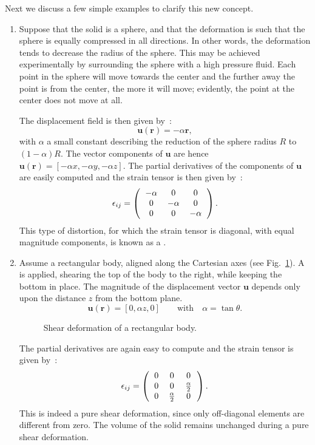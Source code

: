 Next we discuss a few simple examples to clarify this new concept.
\begin{enumerate}\label{strainexamples}
\item Suppose that the solid is a sphere, and that the deformation is such that the sphere is equally compressed in all directions.  In other words, the deformation tends to decrease the radius of the sphere.  This may be achieved experimentally by surrounding the sphere with a high pressure fluid.  Each point in the sphere will move towards the center and the further away the point is from the center, the more it will move; evidently, the point at the center does not move at all.

The displacement field is then given by~:
\[
\mathbf{u}(\mathbf{r})=-\alpha\mathbf{r},
\]
with $\alpha$ a small constant describing the reduction of the sphere radius $R$ to $(1-\alpha)R$.  The vector components of $\mathbf{u}$ are hence $\mathbf{u}(\mathbf{r})=[-\alpha x,-\alpha y,-\alpha z]$.  The partial derivatives of the components of $\mathbf{u}$ are easily computed and the strain tensor is then given by~:
\[
\epsilon_{ij}=
\left(\begin{tabular}{ccc}\centering
$-\alpha$  &  0 & 0 \\ 
0 & $-\alpha$  &  0 \\
0 & 0 & $-\alpha$   \\
\end{tabular}\right).
\]
This type of distortion, for which the strain tensor is diagonal, with equal magnitude components, is known as a .  

\item Assume a rectangular body, aligned along the Cartesian axes (see Fig.~\ref{\chabbr:fig:h2}).  A  is applied, shearing the top of the body to the right, while keeping the bottom in place.  The magnitude of the displacement vector $\mathbf{u}$ depends only upon the distance $z$ from the bottom plane.
\[
\mathbf{u}(\mathbf{r})=[0,\alpha z, 0]\qquad\mbox{with}\quad\alpha=\tan\theta.
\]

\begin{figure}
\caption{Shear deformation of a rectangular body.}
\label{\chabbr:fig:h2}
\end{figure}

The partial derivatives are again easy to compute and the strain tensor is given by~:
\[
\epsilon_{ij}=
\left(\begin{tabular}{ccc}\centering
0 & 0 & 0 \\
0 & 0 & $\frac{\alpha}{2}$\\
0 & $\frac{\alpha}{2}$  & 0 \\
\end{tabular}\right).
\]
This is indeed a pure shear deformation, since only off-diagonal elements are different from zero. The volume of the solid remains unchanged during a pure shear deformation.


\end{enumerate}
